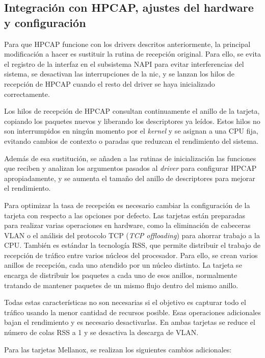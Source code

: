 \documentclass[twoside, 12pt]{epstfg}
\begin{document}
\subsection{Integración con HPCAP, ajustes del hardware y configuración}
\label{sec:Desarrollo:AjustesHardware}

Para que HPCAP funcione con los \glspl{driver} descritos anteriormente, la principal modificación a hacer es sustituir la rutina de recepción original. Para ello, se evita el registro de la interfaz en el subsistema \gls{NAPI} para evitar interferencias del sistema, se desactivan las interrupciones de la \gls{nic}, y se lanzan los hilos de recepción de HPCAP cuando el resto del \gls{driver} se haya inicializado correctamente.

Los hilos de recepción de HPCAP consultan continuamente el anillo de la tarjeta, copiando los paquetes nuevos y liberando los descriptores ya leídos. Estos hilos no son interrumpidos en ningún momento por el \textit{kernel} y se asignan a una CPU fija, evitando cambios de contexto o paradas que reduzcan el rendimiento del sistema.

Además de esa sustitución, se añaden a las rutinas de inicialización las funciones que reciben y analizan los argumentos pasados al \textit{driver} para configurar HPCAP apropiadamente, y se aumenta el tamaño del anillo de descriptores para mejorar el rendimiento.

Para optimizar la tasa de recepción es necesario cambiar la configuración de la tarjeta con respecto a las opciones por defecto. Las tarjetas están preparadas para realizar varias operaciones en hardware, como la eliminación de cabeceras VLAN o el análisis del protocolo TCP (\textit{TCP offloading}) para ahorrar trabajo a la CPU. También es estándar la tecnología \gls{RSS}, que permite distribuir el trabajo de recepción de tráfico entre varios núcleos del procesador. Para ello, se crean varios anillos de recepción, cada uno atendido por un núcleo distinto. La tarjeta se encarga de distribuir los paquetes a cada uno de esos anillos, normalmente tratando de mantener paquetes de un mismo flujo dentro del mismo anillo.

Todas estas características no son necesarias si el objetivo es capturar todo el tráfico usando la menor cantidad de recursos posible. Esas operaciones adicionales bajan el rendimiento y es necesario desactivarlas. En ambas tarjetas se reduce el número de colas \gls{RSS} a 1 y se desactiva la descarga de VLAN.

Para las tarjetas Mellanox, se realizan los siguientes cambios adicionales:
\end{document}
